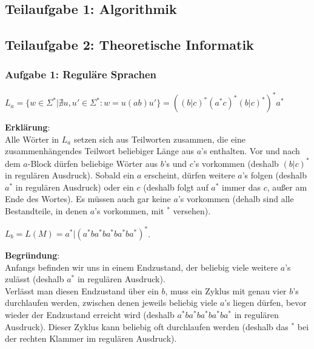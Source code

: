 \subsection{Teilaufgabe 1: Algorithmik}

\subsection{Teilaufgabe 2: Theoretische Informatik}

\subsubsection{Aufgabe 1: Reguläre Sprachen}

\begin{teile}
	\item
	$L_a = \{w \in \Sigma^* | \nexists u,u' \in \Sigma^*: w =u(ab)u'\} = ((b|c)^*(a^*c)^*(b|c)^*)^*a^*$
	
	\textbf{Erklärung}: \\
	Alle Wörter in $L_a$ setzen sich aus Teilworten zusammen, die eine zusammenhängendes Teilwort beliebiger Länge aus $a$'s enthalten. Vor und nach dem $a$-Block dürfen beliebige Wörter aus $b$'s und $c$'s vorkommen (deshalb $(b|c)^*$ in regulären Ausdruck). Sobald ein $a$ erscheint, dürfen weitere $a$'s folgen (deshalb $a^*$ in regulären Ausdruck) oder ein $c$ (deshalb folgt auf $a^*$ immer das $c$, außer am Ende des Wortes). Es müssen auch gar keine $a$'s vorkommen (dehalb sind alle Bestandteile, in denen $a$'s vorkommen, mit $^*$ versehen).

	\item
	$L_b = L(M) = a^*|(a^* ba^* ba^* ba^* ba^*)^*$.
	
	\textbf{Begründung}: \\
	Anfangs befinden wir uns in einem Endzustand, der beliebig viele weitere $a$'s zulässt (deshalb $a^*$ in regulären Ausdruck).\\
	Verlässt man diesen Endzustand über ein $b$, muss ein Zyklus mit genau vier $b$'s durchlaufen werden, zwischen denen jeweils beliebig viele $a$'s liegen dürfen, bevor wieder der Endzustand erreicht wird (deshalb $a^* ba^* ba^* ba^* ba^*$ in regulären Ausdruck). Dieser Zyklus kann beliebig oft durchlaufen werden (deshalb das $^*$ bei der rechten Klammer im regulären Ausdruck).
	

\end{teile}
